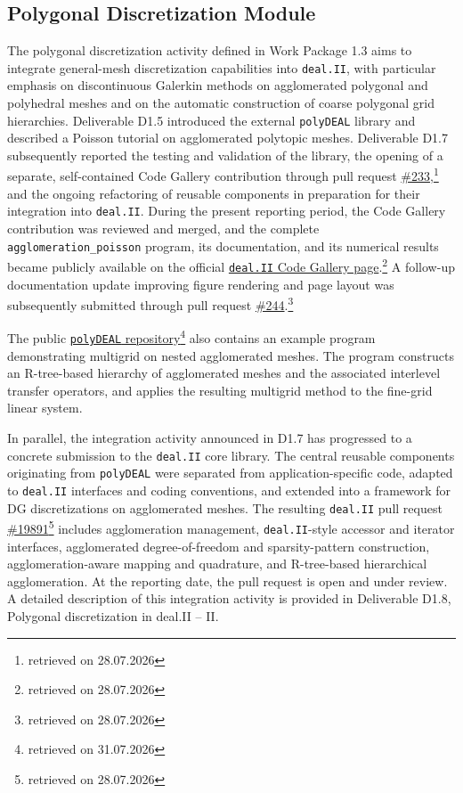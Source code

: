 \documentclass[a4paper,12pt]{article}
\begin{document}
\subsection{Polygonal Discretization Module}

The polygonal discretization activity defined in Work Package 1.3 aims to integrate general-mesh discretization capabilities into \texttt{deal.II}, with particular emphasis on discontinuous Galerkin methods on agglomerated polygonal and polyhedral meshes and on the automatic construction of coarse polygonal grid hierarchies. Deliverable D1.5 introduced the external \texttt{polyDEAL} library and described a Poisson tutorial on agglomerated polytopic meshes.
Deliverable D1.7 subsequently reported the testing and validation of the library, the opening of a separate, self-contained Code Gallery contribution through pull request \href{https://github.com/dealii/code-gallery/pull/233}{\#233},\footnote{retrieved on 28.07.2026} and the ongoing refactoring of reusable components in preparation for their integration into \texttt{deal.II}.
During the present reporting period, the Code Gallery contribution was reviewed and merged, and the complete \texttt{agglomeration\_poisson} program, its documentation, and its numerical results became publicly available on the official \href{https://dealii.org/developer/doxygen/deal.II/code_gallery_agglomeration_poisson.html}{\texttt{deal.II} Code Gallery page}.\footnote{retrieved on 28.07.2026} A follow-up documentation update improving figure rendering and page layout was subsequently submitted through pull request \href{https://github.com/dealii/code-gallery/pull/244}{\#244}.\footnote{retrieved on 28.07.2026}

The public
\href{https://github.com/fdrmrc/Polydeal}
{\texttt{polyDEAL} repository}\footnote{retrieved on 31.07.2026}
also contains an example program demonstrating multigrid on nested
agglomerated meshes. The program constructs an R-tree-based hierarchy of
agglomerated meshes and the associated interlevel transfer operators, and
applies the resulting multigrid method to the fine-grid linear system.

In parallel, the integration activity announced in D1.7 has progressed to a concrete submission to the \texttt{deal.II} core library. The central reusable components originating from \texttt{polyDEAL} were separated from application-specific code, adapted to \texttt{deal.II} interfaces and coding conventions, and extended into a framework for DG discretizations on agglomerated meshes.
The resulting \texttt{deal.II} pull request \href{https://github.com/dealii/dealii/pull/19891}{\#19891}\footnote{retrieved on 28.07.2026} includes agglomeration management, \texttt{deal.II}-style accessor and iterator interfaces, agglomerated degree-of-freedom and sparsity-pattern construction, agglomeration-aware mapping and quadrature, and R-tree-based hierarchical agglomeration. At the reporting date, the pull request is open and under review.
A detailed description of this integration activity is provided in Deliverable D1.8, Polygonal discretization in deal.II -- II.
\end{document}
